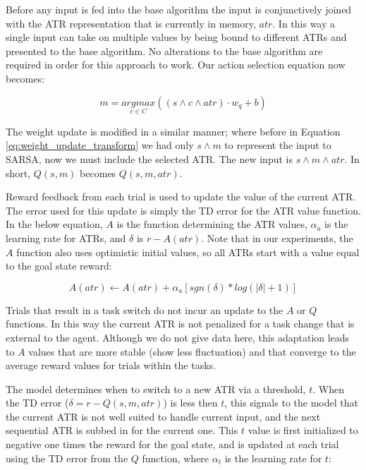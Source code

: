 \documentclass[10pt,letterpaper]{article}
\begin{document}
Before any input is fed into the base algorithm the input is conjunctively joined with the ATR representation that is currently in memory, $atr$. In this way a single input can take on multiple values by being bound to different ATRs and presented to the base algorithm. No alterations to the base algorithm are required in order for this approach to work. Our action selection equation now becomes:

\begin{equation}
m = \underset{c \in C}{argmax}((s \wedge c \wedge atr) \cdot w_{q}+b)
\label{eq:action_selection_atr}
\end{equation}

\noindent The weight update is modified in a similar manner; where before in Equation \ref{eq:weight_update_transform} we had only $s \wedge m$ to represent the input to SARSA, now we must include the selected ATR. The new input is $s \wedge m \wedge atr$. In short, $Q(s,m)$ becomes $Q(s,m,atr)$.

Reward feedback from each trial is used to update the value of the current ATR. The error used for this update is simply the TD error for the ATR value function. In the below equation, $A$ is the function determining the ATR values, $ \alpha_a $ is the learning rate for ATRs, and $\delta$ is $r - A(atr)$. Note that in our experiments, the $A$ function also uses optimistic initial values, so all ATRs start with a value equal to the goal state reward:

\begin{equation}
A(atr) \leftarrow A(atr) + \alpha_a [sgn(\delta) * log(|\delta| + 1)]
\label{eq:a_function_update}
\end{equation}

Trials that result in a task switch do not incur an update to the $A$ or $Q$ functions. In this way the current ATR is not penalized for a task change that is external to the agent. Although we do not give data here, this adaptation leads to $ A $ values that are more stable (show less fluctuation) and that converge to the average reward values for trials within the tasks.

The model determines when to switch to a new ATR via a threshold, $ t $. When the TD error ($\delta=r-Q(s,m,atr)$) is less then $ t $, this signals to the model that the current ATR is not well suited to handle current input, and the next sequential ATR is subbed in for the current one. This $t$ value is first initialized to negative one times the reward for the goal state, and is updated at each trial using the TD error from the $Q$ function, where $ \alpha_t $ is the learning rate for $t$:
\end{document}
